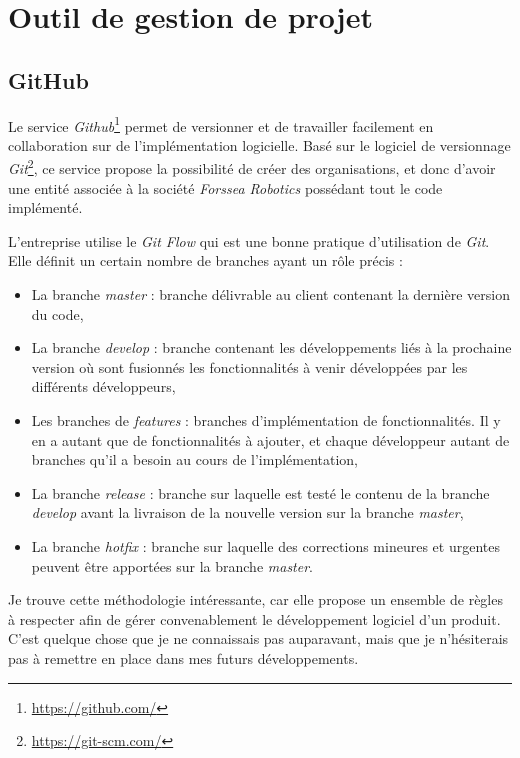 	\section{Outil de gestion de projet}

		\subsection{GitHub}

			Le service \textit{Github}\footnote{\url{https://github.com/}} permet de versionner et de travailler facilement en collaboration sur de l'implémentation logicielle. Basé sur le logiciel de versionnage \textit{Git}\footnote{\url{https://git-scm.com/}}, ce service propose la possibilité de créer des organisations, et donc d'avoir une entité associée à la société \textit{Forssea Robotics} possédant tout le code implémenté.

			L'entreprise utilise le \textit{Git Flow} qui est une bonne pratique d'utilisation de \textit{Git}. Elle définit un certain nombre de branches ayant un rôle précis :

			\begin{itemize}
				\item La branche \textit{master} : branche délivrable au client contenant la dernière version du code,
				\item La branche \textit{develop} : branche contenant les développements liés à la prochaine version où sont fusionnés les fonctionnalités à venir développées par les différents développeurs,
				\item Les branches de \textit{features} : branches d'implémentation de fonctionnalités. Il y en a autant que de fonctionnalités à ajouter, et chaque développeur autant de branches qu'il a besoin au cours de l'implémentation,
				\item La branche \textit{release} : branche sur laquelle est testé le contenu de la branche \textit{develop} avant la livraison de la nouvelle version sur la branche \textit{master},
				\item La branche \textit{hotfix} : branche sur laquelle des corrections mineures et urgentes peuvent être apportées sur la branche \textit{master}.
			\end{itemize}

			Je trouve cette méthodologie intéressante, car elle propose un ensemble de règles à respecter afin de gérer convenablement le développement logiciel d'un produit. C'est quelque chose que je ne connaissais pas auparavant, mais que je n'hésiterais pas à remettre en place dans mes futurs développements.

